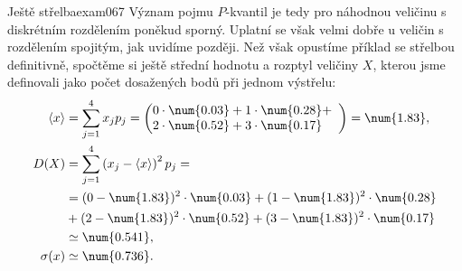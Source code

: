 \begin{mathexam}{Ještě střelba}{exam067}
  Význam pojmu \(P\)-kvantil je tedy pro náhodnou veličinu s diskrétním rozdělením poněkud sporný.
  Uplatní se však velmi dobře u veličin s rozdělením spojitým, jak uvidíme později. Než však
  opustíme příklad se střelbou definitivně, spočtěme si ještě střední hodnotu a rozptyl veličiny
  \(X\), kterou jsme definovali jako počet dosažených bodů při jednom výstřelu:
  \begin{align*}
    \langle x \rangle 
        &=  \sum_{j=1}^{4}x_jp_j =                                                              
            \left(
              \begin{array}{@{}l}
                0\cdot\num{0.03} + 1\cdot\num{0.28} + \\
                2\cdot\num{0.52} + 3\cdot\num{0.17}
              \end{array}
            \right) = \num{1.83},                                                              \\
    D(X)  &= \sum_{j=1}^{4}\left(x_j - \langle x \rangle \right)^2p_j =                        \\
          &= (0-\num{1.83})^2\cdot\num{0.03}+(1-\num{1.83})^2\cdot\num{0.28}                   \\
          &+ (2-\num{1.83})^2\cdot\num{0.52}+(3-\num{1.83})^2\cdot\num{0.17}                   \\
              &\simeq\num{0.541},                                                              \\
    \sigma(x) &\simeq\num{0.736}.
  \end{align*}


\end{mathexam}
